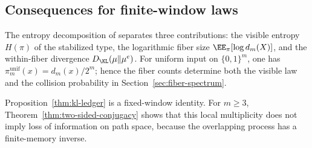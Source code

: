 \subsection{Consequences for finite-window laws}\label{sec:entropy-ledger:consequences}

\begin{remark}
The entropy decomposition of
\cite[Theorem~5.1]{MaZhang2026Nonlinearity} separates three contributions:
the visible entropy $H(\pi)$ of the stabilized type, the logarithmic fiber
size $\EE_\pi[\log d_m(X)]$, and the within-fiber divergence
$D_{\KL}(\mu\|\mu^e)$. For uniform input on $\{0,1\}^m$, one has
$\pi_m^{\mathrm{unif}}(x)=d_m(x)/2^m$; hence the fiber counts determine both
the visible law and the collision probability in Section~\ref{sec:fiber-spectrum}.
\end{remark}

\begin{remark}
Proposition~\ref{thm:kl-ledger} is a fixed-window identity. For $m\ge3$, Theorem~\ref{thm:two-sided-conjugacy} shows that this local multiplicity does not imply loss of information on path space, because the overlapping process has a finite-memory inverse.
\end{remark}
